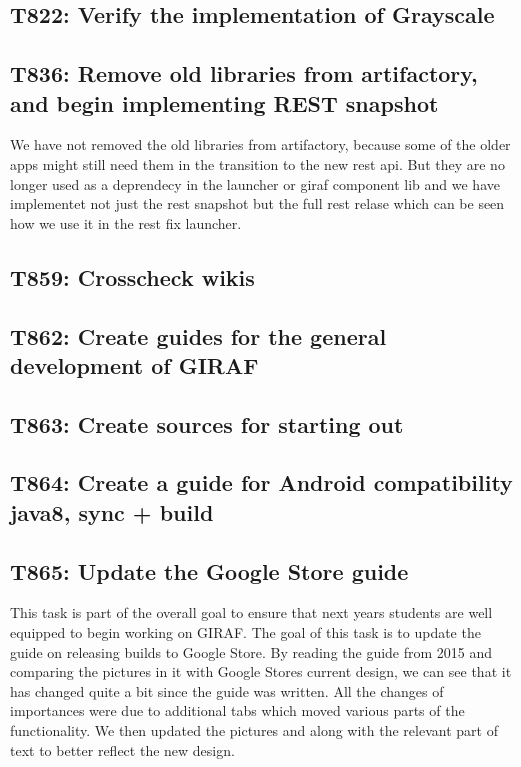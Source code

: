 \subsection{T822: Verify the implementation of Grayscale}

\subsection{T836: Remove old libraries from artifactory, and begin implementing REST
snapshot}
We have not removed the old libraries from artifactory, because some of the
older apps might still need them in the transition to the new rest api. But they
are no longer used as a deprendecy in the launcher or giraf component lib and we
have implementet not just the rest snapshot but the full rest relase which can
be seen how we use it in the rest fix launcher.

\subsection{T859: Crosscheck wikis}

\subsection{T862: Create guides for the general development of GIRAF}

\subsection{T863: Create sources for starting out}

\subsection{T864: Create a guide for Android compatibility java8, sync + build}

\subsection{T865: Update the Google Store guide}

This task is part of the overall goal to ensure that next years students are
well equipped to begin working on GIRAF. The goal of this task is to update the
guide on releasing builds to Google Store. By reading the guide from 2015 and
comparing the pictures in it with Google Stores current design, we can see that
it has changed quite a bit since the guide was written. All the changes of
importances were due to additional tabs which moved various parts of the
functionality. We then updated the pictures and along with the relevant part of
text to better reflect the new design.

